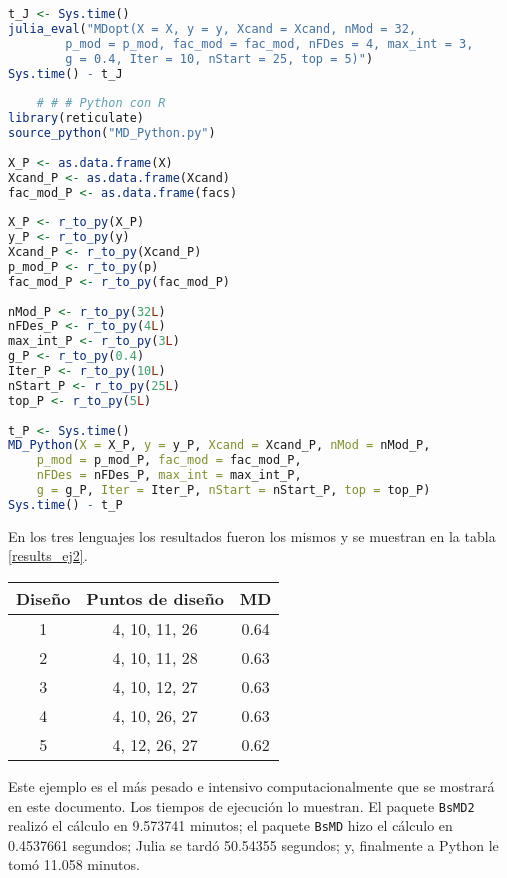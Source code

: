 \begin{lstlisting}[language=R]
t_J <- Sys.time()
julia_eval("MDopt(X = X, y = y, Xcand = Xcand, nMod = 32, 
		p_mod = p_mod, fac_mod = fac_mod, nFDes = 4, max_int = 3, 
		g = 0.4, Iter = 10, nStart = 25, top = 5)")
Sys.time() - t_J
	
	# # # Python con R
library(reticulate)
source_python("MD_Python.py")
	
X_P <- as.data.frame(X)
Xcand_P <- as.data.frame(Xcand)
fac_mod_P <- as.data.frame(facs)
	
X_P <- r_to_py(X_P)
y_P <- r_to_py(y) 
Xcand_P <- r_to_py(Xcand_P)
p_mod_P <- r_to_py(p)
fac_mod_P <- r_to_py(fac_mod_P)
	
nMod_P <- r_to_py(32L)
nFDes_P <- r_to_py(4L)
max_int_P <- r_to_py(3L)
g_P <- r_to_py(0.4)
Iter_P <- r_to_py(10L)
nStart_P <- r_to_py(25L)
top_P <- r_to_py(5L)
	
t_P <- Sys.time()
MD_Python(X = X_P, y = y_P, Xcand = Xcand_P, nMod = nMod_P, 
	p_mod = p_mod_P, fac_mod = fac_mod_P, 
	nFDes = nFDes_P, max_int = max_int_P, 
	g = g_P, Iter = Iter_P, nStart = nStart_P, top = top_P)
Sys.time() - t_P
\end{lstlisting} 

En los tres lenguajes los resultados fueron los mismos y se muestran en la tabla \ref{results_ej2}.

\begin{center}
	\begin{tabular}{cc|c}
		Diseño & Puntos de diseño & MD \\
		\hline
		1 & 4, 10, 11, 26 & 0.64 \\
		
		2 & 4, 10, 11, 28 & 0.63 \\
		
		3 & 4, 10, 12, 27 & 0.63 \\
		
		4 & 4, 10, 26, 27 & 0.63 \\
		
		5 & 4, 12, 26, 27 & 0.62 \\
		
	\end{tabular}
	 \label{results_ej2}
\end{center}

Este ejemplo es el más pesado e intensivo computacionalmente que se mostrará en este documento. Los tiempos de ejecución lo muestran. El paquete \texttt{BsMD2} realizó el cálculo en 9.573741 minutos; el paquete \texttt{BsMD} hizo el cálculo en 0.4537661 segundos; Julia se tardó 50.54355 segundos; y, finalmente a Python le tomó 11.058 minutos.

